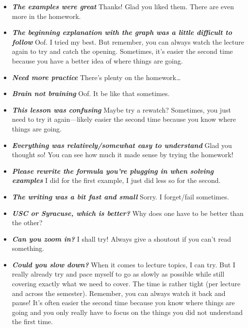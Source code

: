 \documentclass[11pt,letterpaper]{article}
\begin{document}
\begin{itemize}
\item {\bfseries\itshape The examples were great} Thanks! Glad you liked them. There are even more in the homework. \Winkey

\item {\bfseries\itshape The beginning explanation with the graph was a little difficult to follow} Oof. I tried my best. But remember, you can always watch the lecture again to try and catch the opening. Sometimes, it's easier the second time because you have a better idea of where things are going.

\item {\bfseries\itshape Need more practice} There's plenty on the homework\dots \Winkey

\item {\bfseries\itshape Brain not braining} Oof. It be like that sometimes.

\item {\bfseries\itshape This lesson was confusing} Maybe try a rewatch? Sometimes, you just need to try it again---likely easier the second time because you know where things are going.

\item {\bfseries\itshape Everything was relatively/somewhat easy to understand} Glad you thought so! You can see how much it made sense by trying the homework!

\item {\bfseries\itshape Please rewrite the formula you're plugging in when solving examples} I did for the first example, I just did less so for the second.

\item {\bfseries\itshape The writing was a bit fast and small} Sorry. I forget/fail sometimes.

\item {\bfseries\itshape USC or Syracuse, which is better?} Why does one have to be better than the other?

\item {\bfseries\itshape Can you zoom in?} I shall try! Always give a shoutout if you can't read something.

\item {\bfseries\itshape Could you slow down?} When it comes to lecture topics, I can try. But I really already try and pace myself to go as slowly as possible while still covering exactly what we need to cover. The time is rather tight (per lecture and across the semester). Remember, you can always watch it back and pause! It's often easier the second time because you know where things are going and you only really have to focus on the things you did not understand the first time. 


\end{itemize}
\end{document}
